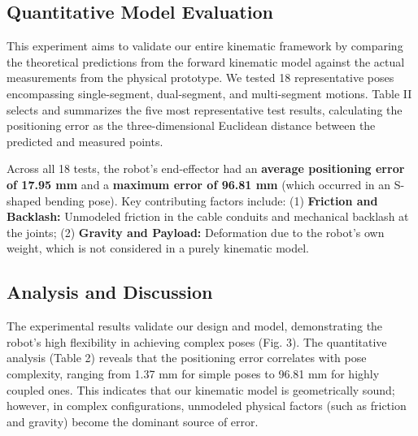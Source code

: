 \documentclass[conference]{IEEEtran}
\begin{document}
\subsection{Quantitative Model Evaluation}

This experiment aims to validate our entire kinematic framework by comparing the theoretical predictions from the forward kinematic model against the actual measurements from the physical prototype. We tested 18 representative poses encompassing single-segment, dual-segment, and multi-segment motions. Table II selects and summarizes the five most representative test results, calculating the positioning error as the three-dimensional Euclidean distance between the predicted and measured points.

Across all 18 tests, the robot's end-effector had an \textbf{average positioning error of 17.95 mm} and a \textbf{maximum error of 96.81 mm} (which occurred in an S-shaped bending pose). Key contributing factors include: (1) \textbf{Friction and Backlash:} Unmodeled friction in the cable conduits and mechanical backlash at the joints; (2) \textbf{Gravity and Payload:} Deformation due to the robot's own weight, which is not considered in a purely kinematic model.

\subsection{Analysis and Discussion}

The experimental results validate our design and model, demonstrating the robot's high flexibility in achieving complex poses (Fig. 3). The quantitative analysis (Table 2) reveals that the positioning error correlates with pose complexity, ranging from 1.37 mm for simple poses to 96.81 mm for highly coupled ones. This indicates that our kinematic model is geometrically sound; however, in complex configurations, unmodeled physical factors (such as friction and gravity) become the dominant source of error.
\end{document}
